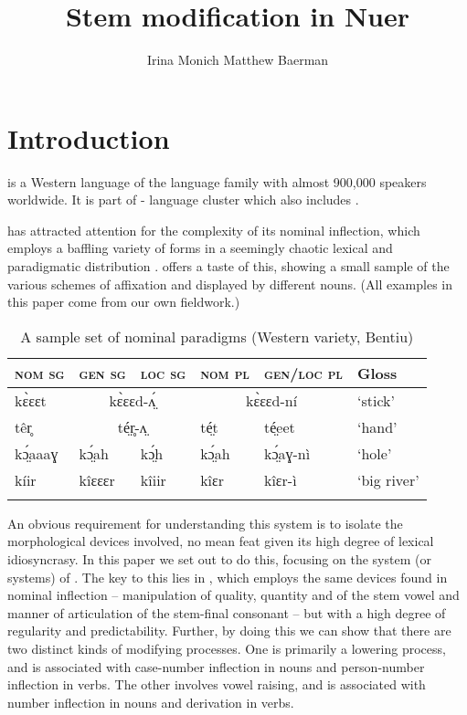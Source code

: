 \documentclass[output=paper,newtxmath,modfonts,nonflat,draftmode]{langsci/langscibook}
\title{Stem modification in Nuer}
\author{Irina Monich\affiliation{University of Surrey} \lastand Matthew Baerman\affiliation{University of Surrey}}
\begin{document}
\maketitle

\section{Introduction} %
 
 is a Western  language of the  language family with almost 900,000 speakers worldwide. It is part of - language cluster which also includes . 

 has attracted attention for the complexity of its nominal inflection, which employs a baffling variety of forms in a seemingly chaotic lexical and paradigmatic distribution \citep{Frank1999, Baerman2012}.  offers a taste of this, showing a small sample of the various schemes of affixation and  displayed by different nouns. (All examples in this paper come from our own fieldwork.)



\begin{table}
\begin{tabularx}{\textwidth}{XXlXlX}
\lsptoprule
\bfseries\scshape nom sg & \bfseries\scshape gen sg & \bfseries\scshape loc sg & \bfseries\scshape nom pl & \bfseries\scshape gen/loc pl & \bfseries Gloss\\
\midrule
kɛ̀ɛɛt & \multicolumn{2}{c}{kɛ̀ɛɛd-ʌ̤́} & \multicolumn{2}{c}{kɛ̀ɛɛd-ní} & ‘stick’\\
têr̥ & \multicolumn{2}{c}{té̤r̥-ʌ̤} & té̤t & té̤eet & ‘hand’\\
kɔ̤́aaaɣ & kɔ̤́ah & kɔ̤́h & kɔ̤́ah & kɔ̤́aɣ-nì & ‘hole’\\
kíir & kîɛɛɛr & kîiir & kîɛr & kîɛr-ì & ‘big river’\\
\lspbottomrule
\end{tabularx}
\caption{A sample set of nominal paradigms (Western variety, Bentiu)}
\label{tab:monich:1}
\end{table}

An obvious requirement for understanding this system is to isolate the morphological devices involved, no mean feat given its high degree of lexical idiosyncrasy. In this paper we set out to do this, focusing on the system (or systems) of . The key to this lies in , which employs the same devices found in nominal inflection – manipulation of quality, quantity and  of the stem vowel and manner of articulation of the stem-final consonant – but with a high degree of regularity and predictability. Further, by doing this we can show that there are two distinct kinds of  modifying processes. One is primarily a lowering process, and is associated with case-number inflection in nouns and person-number inflection in verbs. The other involves vowel raising, and is associated with number inflection in nouns and derivation in verbs.
\end{document}

